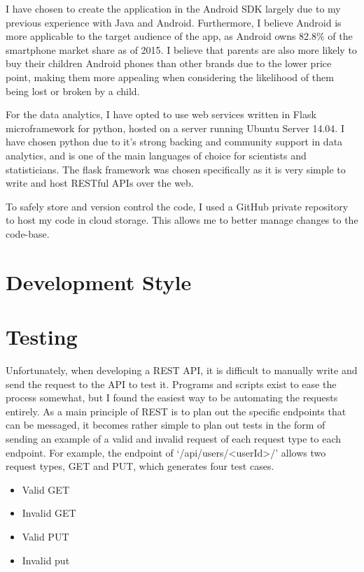 I have chosen to create the application in the Android SDK largely due to my previous experience with Java and Android. 
Furthermore, I believe Android is more applicable to the target audience of the app, as Android owns 82.8\% of the smartphone market share as of 2015.
I believe that parents are also more likely to buy their children Android phones than other brands due to the lower price point, making them more appealing when considering the likelihood of them being lost or broken by a child.

For the data analytics, I have opted to use web services written in Flask microframework for python, hosted on a server running Ubuntu Server 14.04. 
I have chosen python due to it's strong backing and community support in data analytics, and is one of the main languages of choice for scientists and statisticians.
The flask framework was chosen specifically as it is very simple to write and host RESTful APIs over the web.

To safely store and version control the code, I used a GitHub private repository to host my code in cloud storage. 
This allows me to better manage changes to the code-base. 

\section{Development Style}

\section{Testing}
Unfortunately, when developing a REST API, it is difficult to manually write and send the request to the API to test it.
Programs and scripts exist to ease the process somewhat, but I found the easiest way to be automating the requests entirely. 
As a main principle of REST is to plan out the specific endpoints that can be messaged, it becomes rather simple to plan out tests in the form of sending an example of a valid and invalid request of each request type to each endpoint.
For example, the endpoint of `/api/users/<userId>/' allows two request types, GET and PUT, which generates four test cases.
\begin{itemize}
	\item{Valid GET}
	\item{Invalid GET}
	\item{Valid PUT}
	\item{Invalid put}
\end{itemize}  

